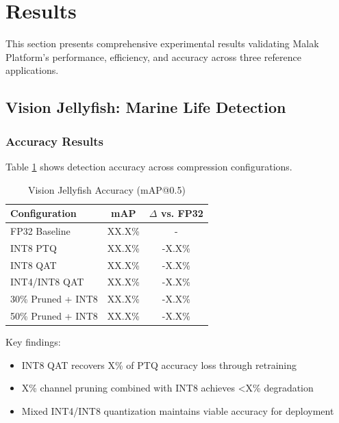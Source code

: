 \section{Results}


This section presents comprehensive experimental results validating Malak Platform's performance, efficiency, and accuracy across three reference applications.

\subsection{Vision Jellyfish: Marine Life Detection}

\subsubsection{Accuracy Results}

Table \ref{tab:jellyfish_accuracy} shows detection accuracy across compression configurations.

\begin{table}[h]
\centering
\caption{Vision Jellyfish Accuracy (mAP@0.5)}
\label{tab:jellyfish_accuracy}
\begin{tabular}{lcc}
\hline
\textbf{Configuration} & \textbf{mAP} & \textbf{$\Delta$ vs. FP32} \\
\hline
FP32 Baseline & XX.X\% & - \\
INT8 PTQ & XX.X\% & -X.X\% \\
INT8 QAT & XX.X\% & -X.X\% \\
INT4/INT8 QAT & XX.X\% & -X.X\% \\
30\% Pruned + INT8 & XX.X\% & -X.X\% \\
50\% Pruned + INT8 & XX.X\% & -X.X\% \\
\hline
\end{tabular}
\end{table}

Key findings:
\begin{itemize}
\item INT8 QAT recovers X\% of PTQ accuracy loss through retraining
\item X\% channel pruning combined with INT8 achieves <X\% degradation
\item Mixed INT4/INT8 quantization maintains viable accuracy for deployment
\end{itemize}

